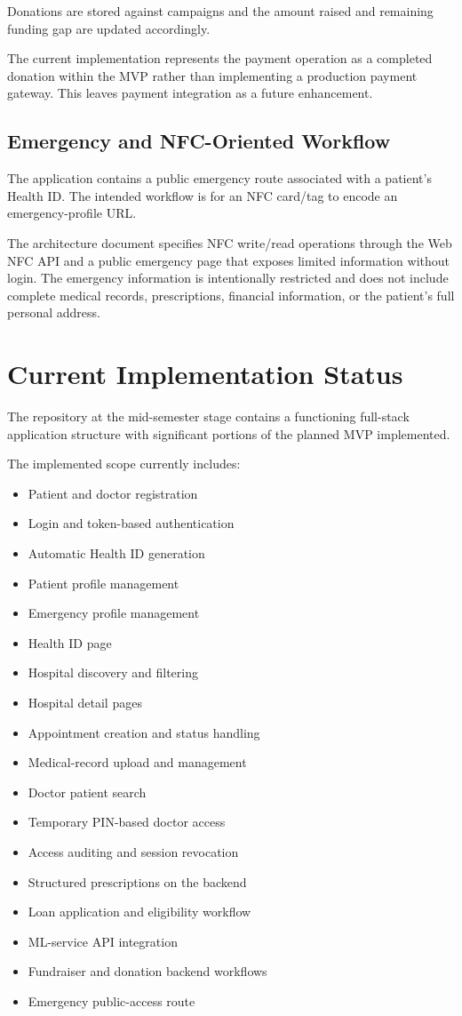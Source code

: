 \documentclass{tietreport}
\begin{document}
Donations are stored against campaigns and the amount raised and
remaining funding gap are updated accordingly.

The current implementation represents the payment operation as a
completed donation within the MVP rather than implementing a production
payment gateway. This leaves payment integration as a future
enhancement.

\subsection{Emergency and NFC-Oriented Workflow}

The application contains a public emergency route associated with a
patient's Health ID. The intended workflow is for an NFC card/tag to
encode an emergency-profile URL.

The architecture document specifies NFC write/read operations through
the Web NFC API and a public emergency page that exposes limited
information without login. The emergency information is intentionally
restricted and does not include complete medical records, prescriptions,
financial information, or the patient's full personal address.

\section{Current Implementation Status}

The repository at the mid-semester stage contains a functioning
full-stack application structure with significant portions of the
planned MVP implemented.

The implemented scope currently includes:

\begin{itemize}
  \item Patient and doctor registration
  \item Login and token-based authentication
  \item Automatic Health ID generation
  \item Patient profile management
  \item Emergency profile management
  \item Health ID page
  \item Hospital discovery and filtering
  \item Hospital detail pages
  \item Appointment creation and status handling
  \item Medical-record upload and management
  \item Doctor patient search
  \item Temporary PIN-based doctor access
  \item Access auditing and session revocation
  \item Structured prescriptions on the backend
  \item Loan application and eligibility workflow
  \item ML-service API integration
  \item Fundraiser and donation backend workflows
  \item Emergency public-access route
\end{itemize}
\end{document}

